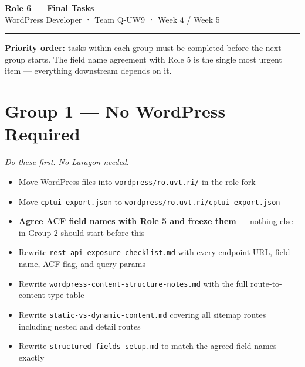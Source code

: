 \documentclass[11pt,a4paper]{article}
\begin{document}

\begin{center}
    {\Large\bfseries\color{uvtBlue} Role 6 --- Final Tasks}\\[0.4em]
    {\small WordPress Developer \textbf{·} Team Q-UW9 \textbf{·} Week 4 / Week 5}
\end{center}

\vspace{0.3em}
\textcolor{uvtYellow}{\rule{\linewidth}{2pt}}
\vspace{0.8em}

{\small
\noindent
\textbf{Priority order:} tasks within each group must be completed before the next group starts.
The field name agreement with Role 5 is the single most urgent item --- everything downstream
depends on it.
}

\vspace{1em}

\section{Group 1 --- No WordPress Required}

\textit{Do these first. No Laragon needed.}

\begin{itemize}
    \item[$\square$] Move WordPress files into \texttt{wordpress/ro.uvt.ri/} in the role fork
    \item[$\square$] Move \texttt{cptui-export.json} to \texttt{wordpress/ro.uvt.ri/cptui-export.json}
    \item[$\square$] \textbf{Agree ACF field names with Role 5 and freeze them} --- nothing else in Group 2 should start before this
    \item[$\square$] Rewrite \texttt{rest-api-exposure-checklist.md} with every endpoint URL, field name, ACF flag, and query params
    \item[$\square$] Rewrite \texttt{wordpress-content-structure-notes.md} with the full route-to-content-type table
    \item[$\square$] Rewrite \texttt{static-vs-dynamic-content.md} covering all sitemap routes including nested and detail routes
    \item[$\square$] Rewrite \texttt{structured-fields-setup.md} to match the agreed field names exactly
\end{itemize}
\end{document}
